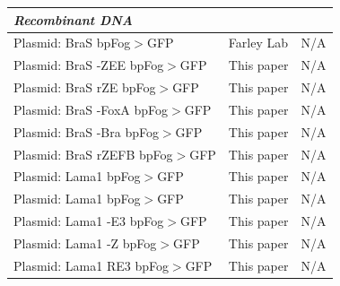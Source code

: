 \begin{landscape}
\begin{longtable}{p{} p{} p{}}
        \hline \textit{Recombinant DNA} \\ \hline
        Plasmid: BraS bpFog$>$GFP & Farley Lab & N/A \\ 
        Plasmid: BraS -ZEE bpFog$>$GFP & This paper & N/A \\
        Plasmid: BraS rZE bpFog$>$GFP & This paper & N/A \\
        Plasmid: BraS -FoxA bpFog$>$GFP & This paper & N/A \\
        Plasmid: BraS -Bra bpFog$>$GFP & This paper & N/A \\ 
        Plasmid: BraS rZEFB bpFog$>$GFP & This paper & N/A \\
        Plasmid: Lama1 bpFog$>$GFP & This paper & N/A \\
        Plasmid: Lama1 bpFog$>$GFP & This paper & N/A \\
        Plasmid: Lama1 -E3 bpFog$>$GFP & This paper & N/A \\
        Plasmid: Lama1 -Z bpFog$>$GFP & This paper & N/A \\
        Plasmid: Lama1 RE3 bpFog$>$GFP & This paper & N/A \\


\end{longtable}
\end{landscape}
